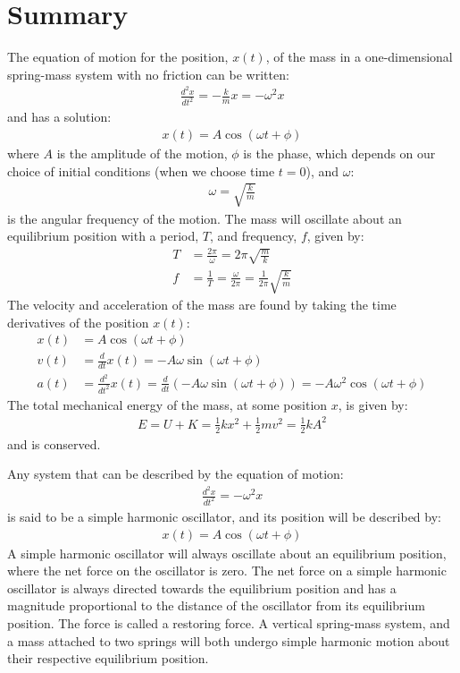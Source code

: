 \section{Summary}
\vspace{-0.25cm}
\begin{chapterSummary}
The equation of motion for the position, $x(t)$, of the mass in a one-dimensional spring-mass system with no friction can be written:
\begin{align*}
\frac{d^2x}{dt^2}=-\frac{k}{m}x = -\omega^2 x
\end{align*}
and has a solution:
\begin{align*}
x(t) = A\cos(\omega t + \phi)
\end{align*}
where $A$ is the amplitude of the motion, $\phi$ is the phase, which depends on our choice of initial conditions (when we choose time $t=0$), and $\omega$:
\begin{align*}
\omega = \sqrt{\frac{k}{m}}
\end{align*}
is the angular frequency of the motion. The mass will oscillate about an equilibrium position with a period, $T$, and frequency, $f$, given by:
\begin{align*}
T&=\frac{2\pi}{\omega}=2\pi\sqrt{\frac{m}{k}}\\
f&=\frac{1}{T}=\frac{\omega}{2\pi}=\frac{1}{2\pi}\sqrt{\frac{k}{m}}
\end{align*}
The velocity and acceleration of the mass are found by taking the time derivatives of the position $x(t)$:
\begin{align*}
x(t)&= A \cos(\omega t + \phi)\\
v(t)&=\frac{d}{dt}x(t) = -A\omega\sin(\omega t + \phi)\\
a(t)&= \frac{d^2}{dt^2}x(t) =\frac{d}{dt}\left( -A\omega\sin(\omega t + \phi)\right)= -A\omega^2\cos(\omega t + \phi)
\end{align*}
The total mechanical energy of the mass, at some position $x$, is given by:
\begin{align*}
E =U+K=\frac{1}{2}kx^2+\frac{1}{2}mv^2= \frac{1}{2}kA^2
\end{align*}
and is conserved. 

Any system that can be described by the equation of motion:
\begin{align*}
\frac{d^2x}{dt^2}= -\omega^2 x
\end{align*}
is said to be a simple harmonic oscillator, and its position will be described by:
\begin{align*}
x(t) = A\cos(\omega t + \phi)
\end{align*}
A simple harmonic oscillator will always oscillate about an equilibrium position, where the net force on the oscillator is zero. The net force on a simple harmonic oscillator is always directed towards the equilibrium position and has a magnitude proportional to the distance of the oscillator from its equilibrium position. The force is called a restoring force. A vertical spring-mass system, and a mass attached to two springs will both undergo simple harmonic motion about their respective equilibrium position.


\end{chapterSummary}
